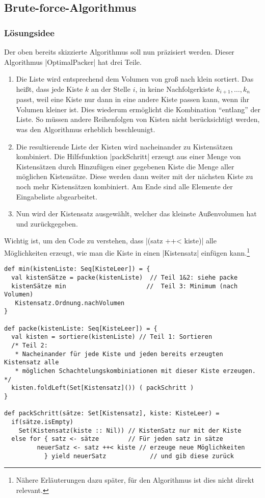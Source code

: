 \subsection{Brute-force-Algorithmus}
\label{bruteforce}
\subsubsection{Lösungsidee}
\lstset{basicstyle=\ttfamily}
 Der oben bereits skizzierte Algorithmus soll nun präzisiert werden.
 Dieser Algorithmus |OptimalPacker| hat drei Teile.
\begin{enumerate}
 \item Die Liste wird entsprechend dem Volumen von groß nach klein sortiert.
  Das heißt, dass jede Kiste $k$ an der Stelle $i$, in keine Nachfolgerkiste $k_{i+1}, \dots, k_n$ passt,
   weil eine Kiste nur dann in eine andere Kiste passen kann, wenn ihr Volumen kleiner ist.
  Dies wiederum ermöglicht die Kombination ``entlang'' der Liste.
  So müssen andere Reihenfolgen von Kisten nicht berücksichtigt werden, was den Algorithmus erheblich beschleunigt.
 \item Die resultierende Liste der Kisten wird nacheinander zu Kistensätzen kombiniert.
  Die Hilfsfunktion |packSchritt| erzeugt aus einer Menge von Kistensätzen durch Hinzufügen einer gegebenen Kiste die Menge aller möglichen Kistensätze.
  Diese werden dann weiter mit der nächsten Kiste zu noch mehr Kistensätzen kombiniert.
  Am Ende sind alle Elemente der Eingabeliste abgearbeitet.
 \item Nun wird der Kistensatz ausgewählt, welcher das kleinste Außenvolumen hat und zurückgegeben.
\end{enumerate}
 Wichtig ist, um den Code zu verstehen, dass |(satz ++< kiste)| alle Möglichkeiten erzeugt,
 wie man die Kiste in einen |Kistensatz| einfügen kann.\footnote{Nähere Erläuterungen dazu später, für den Algorithmus ist dies nicht direkt relevant.}
\vfill
\lstset{basicstyle=\ttfamily\small}
\begin{lstlisting}
def min(kistenListe: Seq[KisteLeer]) = {
  val kistenSätze = packe(kistenListe)  // Teil 1&2: siehe packe
  kistenSätze min                      //  Teil 3: Minimum (nach Volumen)
   Kistensatz.Ordnung.nachVolumen
}

def packe(kistenListe: Seq[KisteLeer]) = {
  val kisten = sortiere(kistenListe) // Teil 1: Sortieren
  /* Teil 2:
   * Nacheinander für jede Kiste und jeden bereits erzeugten Kistensatz alle
   * möglichen Schachtelungskombiniationen mit dieser Kiste erzeugen. */
  kisten.foldLeft(Set[Kistensatz]()) ( packSchritt )
}

def packSchritt(sätze: Set[Kistensatz], kiste: KisteLeer) =
  if(sätze.isEmpty)
    Set(Kistensatz(kiste :: Nil)) // KistenSatz nur mit der Kiste
  else for { satz <- sätze 		  // Für jeden satz in sätze
	     neuerSatz <- satz ++< kiste // erzeuge neue Möglichkeiten
           } yield neuerSatz            // und gib diese zurück
\end{lstlisting}
\lstset{basicstyle=\ttfamily}
\vfill

